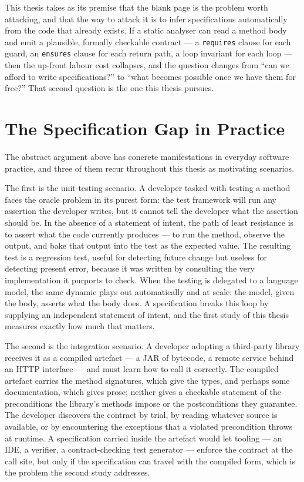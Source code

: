 This thesis takes as its premise that the blank page is the problem worth
attacking, and that the way to attack it is to infer specifications
automatically from the code that already exists. If a static analyser can
read a method body and emit a plausible, formally checkable contract --- a
\texttt{requires} clause for each guard, an \texttt{ensures} clause for each
return path, a loop invariant for each loop --- then the up-front labour cost
collapses, and the question changes from ``can we afford to write
specifications?'' to ``what becomes possible once we have them for free?''
That second question is the one this thesis pursues.

\section{The Specification Gap in Practice}

The abstract argument above has concrete manifestations in everyday software
practice, and three of them recur throughout this thesis as motivating
scenarios.

The first is the unit-testing scenario. A developer tasked with testing a method
faces the oracle problem in its purest form: the test framework will run any
assertion the developer writes, but it cannot tell the developer what the
assertion should be. In the absence of a statement of intent, the path of least
resistance is to assert what the code currently produces --- to run the method,
observe the output, and bake that output into the test as the expected value.
The resulting test is a regression test, useful for detecting future change but
useless for detecting present error, because it was written by consulting the
very implementation it purports to check. When the testing is delegated to a
language model, the same dynamic plays out automatically and at scale: the model,
given the body, asserts what the body does. A specification breaks this loop by
supplying an independent statement of intent, and the first study of this thesis
measures exactly how much that matters.

The second is the integration scenario. A developer adopting a third-party
library receives it as a compiled artefact --- a JAR of bytecode, a remote
service behind an HTTP interface --- and must learn how to call it correctly.
The compiled artefact carries the method signatures, which give the types, and
perhaps some documentation, which gives prose; neither gives a checkable
statement of the preconditions the library's methods impose or the postconditions
they guarantee. The developer discovers the contract by trial, by reading
whatever source is available, or by encountering the exceptions that a violated
precondition throws at runtime. A specification carried inside the artefact would
let tooling --- an IDE, a verifier, a contract-checking test generator --- enforce
the contract at the call site, but only if the specification can travel with the
compiled form, which is the problem the second study addresses.

